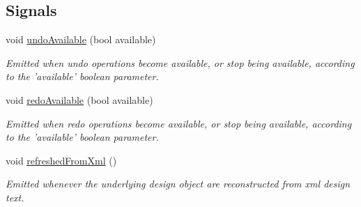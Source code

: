 \subsection*{Signals}
\begin{DoxyCompactItemize}
\item 
\hypertarget{class_picto_1_1_design_root_ace35c7f1300eb13025ec1633742990a5}{void \hyperlink{class_picto_1_1_design_root_ace35c7f1300eb13025ec1633742990a5}{undo\-Available} (bool available)}\label{class_picto_1_1_design_root_ace35c7f1300eb13025ec1633742990a5}

\begin{DoxyCompactList}\small\item\em Emitted when undo operations become available, or stop being available, according to the 'available' boolean parameter. \end{DoxyCompactList}\item 
\hypertarget{class_picto_1_1_design_root_a078887264137d9a082c7e589b8d749ee}{void \hyperlink{class_picto_1_1_design_root_a078887264137d9a082c7e589b8d749ee}{redo\-Available} (bool available)}\label{class_picto_1_1_design_root_a078887264137d9a082c7e589b8d749ee}

\begin{DoxyCompactList}\small\item\em Emitted when redo operations become available, or stop being available, according to the 'available' boolean parameter. \end{DoxyCompactList}\item 
\hypertarget{class_picto_1_1_design_root_a64bd2edd0eeed3f8b31d954c0f220fe0}{void \hyperlink{class_picto_1_1_design_root_a64bd2edd0eeed3f8b31d954c0f220fe0}{refreshed\-From\-Xml} ()}\label{class_picto_1_1_design_root_a64bd2edd0eeed3f8b31d954c0f220fe0}

\begin{DoxyCompactList}\small\item\em Emitted whenever the underlying design object are reconstructed from xml design text. \end{DoxyCompactList}\end{DoxyCompactItemize}
